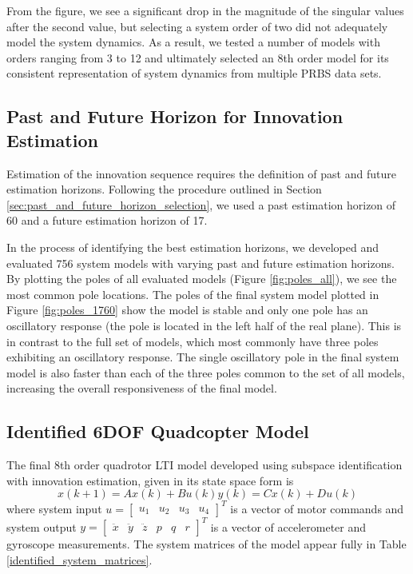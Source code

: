 From the figure, we see a significant drop in the magnitude of the singular values after the second value, but selecting a system order of two did not adequately model the system dynamics. As a result, we tested a number of models with orders ranging from 3 to 12 and ultimately selected an 8th order model for its consistent representation of system dynamics from multiple PRBS data sets.

\subsection{Past and Future Horizon for Innovation Estimation}
Estimation of the innovation sequence requires the definition of past and future estimation horizons. Following the procedure outlined in Section \ref{sec:past_and_future_horizon_selection}, we used a past estimation horizon of 60 and a future estimation horizon of 17. 

In the process of identifying the best estimation horizons, we developed and evaluated 756 system models with varying past and future estimation horizons. By plotting the poles of all evaluated models (Figure \ref{fig:poles_all}), we see the most common pole locations. The poles of the final system model plotted in Figure \ref{fig:poles_1760} show the model is stable and only one pole has an oscillatory response (the pole is located in the left half of the real plane). This is in contrast to the full set of models, which most commonly have three poles exhibiting an oscillatory response. The single oscillatory pole in the final system model is also faster than each of the three poles common to the set of all models, increasing the overall responsiveness of the final model. 

\subsection{Identified 6DOF Quadcopter Model}
The final 8th order quadrotor LTI model developed using subspace identification with innovation estimation, given in its state space form is 
\begin{subequations}\label{eq:2_lti}
\begin{equation*}x(k+1) = Ax(k) + Bu(k)\end{equation*}
\begin{equation*}y(k) = Cx(k) + Du(k)\end{equation*}
\end{subequations}
where system input $u = \begin{bmatrix}u_1 & u_2 & u_3 & u_4\end{bmatrix}^T$ is a vector of motor commands and system output $y = \begin{bmatrix}\ddot x & \ddot y & \ddot z & p & q & r\end{bmatrix}^T$ is a vector of accelerometer and gyroscope measurements. The system matrices of the model appear fully in Table \ref{identified_system_matrices}.

